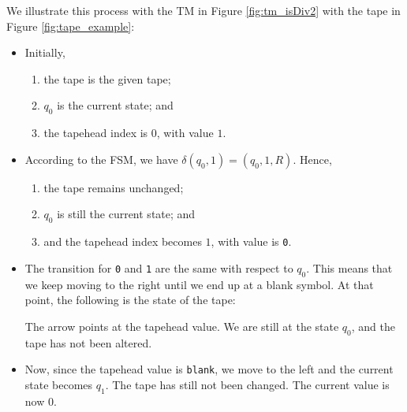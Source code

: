 We illustrate this process with the TM in Figure \ref{fig:tm_isDiv2} with the tape in Figure \ref{fig:tape_example}:
\begin{itemize}
    \item Initially, 
    \begin{enumerate}
        \item the tape is the given tape;
        \item $q_0$ is the current state; and 
        \item the tapehead index is $0$, with value $1$.
    \end{enumerate}
    \item According to the FSM, we have $\delta(q_0, 1) = (q_0, 1, R)$. Hence,
    \begin{enumerate}
        \item the tape remains unchanged;
        \item $q_0$ is still the current state; and
        \item and the tapehead index becomes $1$, with value is \texttt{0}.
    \end{enumerate}
    \item The transition for \texttt{0} and \texttt{1} are the same with respect to $q_0$. This means that we keep moving to the right until we end up at a blank symbol. At that point, the following is the state of the tape:
    \begin{figure}[H]
        \centering
    \end{figure}
    The arrow points at the tapehead value. We are still at the state $q_0$, and the tape has not been altered.
    
    \item Now, since the tapehead value is \texttt{blank}, we move to the left and the current state becomes $q_1$. The tape has still not been changed. The current value is now $0$.
    

\end{itemize}
